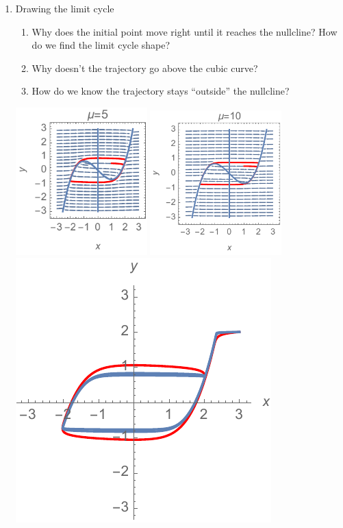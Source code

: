 \documentclass[12pt,letterpaper,noanswers]{exam}
\begin{document}
\begin{enumerate}
\item Drawing the limit cycle
\begin{enumerate}
    \item Why does the initial point move right until it reaches the nullcline?  How do we find the limit cycle shape?

\item Why doesn't the trajectory go above the cubic curve?

\item How do we know the trajectory stays ``outside'' the nullcline?
\end{enumerate}



\includegraphics[width=2in]{img/C16vdp-p2a.pdf}
     \includegraphics[width=2in]{img/C16vdp-p2b.pdf}\hfill
      \includegraphics{img/C16vdp-p2c.pdf}


\end{enumerate}
\end{document}
